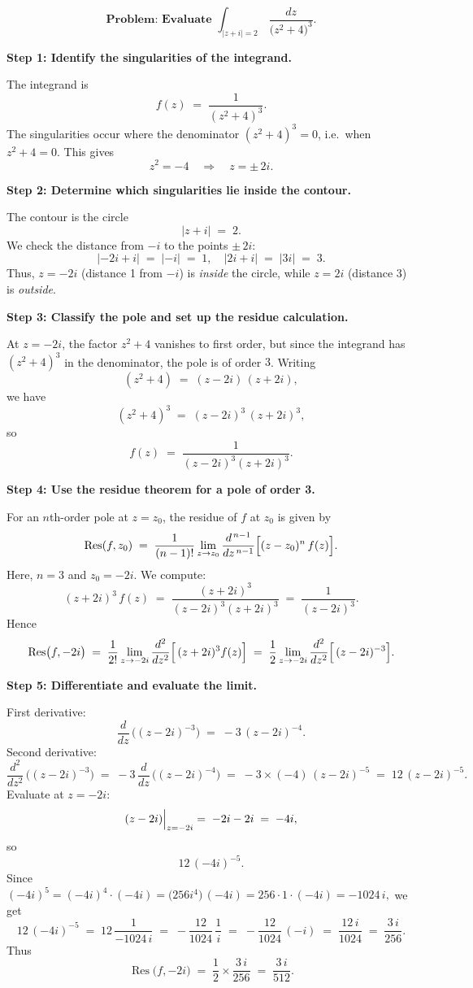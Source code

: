 \documentclass[12pt]{article}
\theoremstyle{definition} %
\theoremstyle{plain} %
\begin{document}
\[
\textbf{Problem: Evaluate } \int_{\lvert z+i\rvert=2}\,\frac{dz}{\bigl(z^2+4\bigr)^3}.
\]

\textbf{Step 1: Identify the singularities of the integrand.}

The integrand is
\[
f(z) \;=\; \frac{1}{(z^2 + 4)^3}.
\]
The singularities occur where the denominator \((z^2+4)^3 = 0\), i.e.\ when \(z^2+4=0\).  This gives
\[
z^2 = -4 
\quad\Longrightarrow\quad
z = \pm\,2i.
\]

\textbf{Step 2: Determine which singularities lie inside the contour.}

The contour is the circle
\[
\lvert z + i\rvert \;=\; 2.
\]
We check the distance from \(-i\) to the points \(\pm\,2i\):
\[
\lvert -2i + i\rvert \;=\;\lvert -i\rvert \;=\;1,
\quad
\lvert 2i + i\rvert \;=\;\lvert 3i\rvert \;=\;3.
\]
Thus, \(z=-2i\) (distance 1 from \(-i\)) is \emph{inside} the circle, while \(z=2i\) (distance 3) is \emph{outside}.

\textbf{Step 3: Classify the pole and set up the residue calculation.}

At \(z=-2i\), the factor \(z^2+4\) vanishes to first order, but since the integrand has \((z^2+4)^3\) in the denominator, the pole is of order \(3\).  Writing
\[
(z^2+4)
\;=\;
(z-2i)\,(z+2i),
\]
we have
\[
(z^2+4)^3 
\;=\; (z-2i)^3 \,(z+2i)^3,
\]
so
\[
f(z) 
\;=\;
\frac{1}{(z-2i)^3 (z+2i)^3}.
\]

\textbf{Step 4: Use the residue theorem for a pole of order 3.}

For an \(n\)th-order pole at \(z=z_0\), the residue of \(f\) at \(z_0\) is given by
\[
\operatorname{Res}(f, z_0)
\;=\;
\frac{1}{(n-1)!}
\lim_{z \to z_0}
\frac{d^{\,n-1}}{dz^{\,n-1}}
\Bigl[(z-z_0)^n \, f(z)\Bigr].
\]
Here, \(n=3\) and \(z_0=-2i\).  We compute:
\[
(z+2i)^3 \, f(z)
\;=\;
\frac{(z+2i)^3}{(z-2i)^3 (z+2i)^3}
\;=\;
\frac{1}{(z-2i)^3}.
\]
Hence
\[
\operatorname{Res}\bigl(f,-2i\bigr)
\;=\;
\frac{1}{2!}
\lim_{z \to -2i}
\frac{d^2}{dz^2}
\Bigl[\,(z+2i)^3 f(z)\Bigr]
\;=\;
\frac{1}{2}
\lim_{z \to -2i}
\frac{d^2}{dz^2}
\Bigl[\,(z-2i)^{-3}\Bigr].
\]

\textbf{Step 5: Differentiate and evaluate the limit.}

First derivative:
\[
\frac{d}{dz}\,\bigl((z-2i)^{-3}\bigr)
\;=\;
-3\,(z-2i)^{-4}.
\]
Second derivative:
\[
\frac{d^2}{dz^2}\,\bigl((z-2i)^{-3}\bigr)
\;=\;
-3\,\frac{d}{dz}\,\bigl((z-2i)^{-4}\bigr)
\;=\;
-3 \times (-4)\,(z-2i)^{-5}
\;=\;
12\,(z-2i)^{-5}.
\]
Evaluate at \(z=-2i\):
\[
(z-2i)\Bigl|_{z=-2i}
\;=\;
-2i - 2i
\;=\;
-4i,
\]
so
\[
12\,(-4i)^{-5}.
\]
Since \((-4i)^5 = (-4i)^4 \cdot (-4i) = \bigl(256 i^4\bigr)\,(-4i) = 256 \cdot 1 \cdot (-4i) = -1024\,i,\)
we get
\[
12\,(-4i)^{-5}
\;=\;
12 \,\frac{1}{-1024\,i}
\;=\;
-\frac{12}{1024}\,\frac{1}{i}
\;=\;
-\frac{12}{1024}\,(-i)
\;=\;
\frac{12\,i}{1024}
\;=\;
\frac{3\,i}{256}.
\]
Thus
\[
\operatorname{Res}\bigl(f,-2i\bigr)
\;=\;
\frac{1}{2} \times \frac{3\,i}{256}
\;=\;
\frac{3\,i}{512}.
\]
\end{document}
